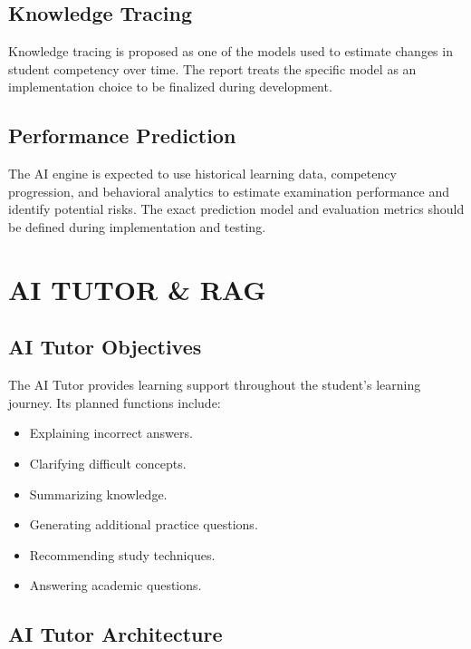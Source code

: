 \documentclass[12pt,a4paper]{report}
\begin{document}
\section{Knowledge Tracing}

Knowledge tracing is proposed as one of the models used to estimate changes in student competency over time. The report treats the specific model as an implementation choice to be finalized during development.

\section{Performance Prediction}

The AI engine is expected to use historical learning data, competency progression, and behavioral analytics to estimate examination performance and identify potential risks. The exact prediction model and evaluation metrics should be defined during implementation and testing.

\chapter{AI TUTOR \& RAG}

\section{AI Tutor Objectives}

The AI Tutor provides learning support throughout the student's learning journey. Its planned functions include:

\begin{itemize}
    \item Explaining incorrect answers.
    \item Clarifying difficult concepts.
    \item Summarizing knowledge.
    \item Generating additional practice questions.
    \item Recommending study techniques.
    \item Answering academic questions.
\end{itemize}

\section{AI Tutor Architecture}
\end{document}
